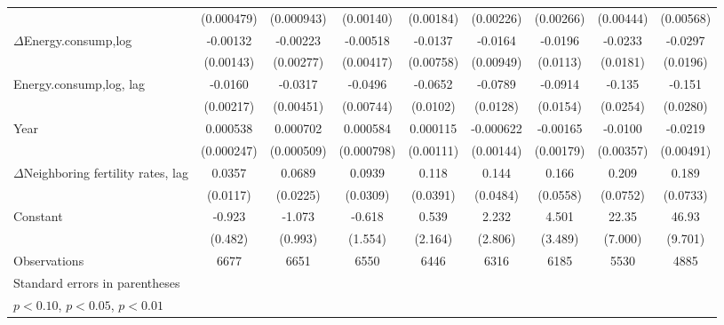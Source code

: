 \begin{table}[htbp]
\begin{tabular}{l*{8}{c}}
                    &  (0.000479)         &  (0.000943)         &   (0.00140)         &   (0.00184)         &   (0.00226)         &   (0.00266)         &   (0.00444)         &   (0.00568)         \\
[1em]
$\Delta$Energy.consump,log           &    -0.00132         &    -0.00223         &    -0.00518         &     -0.0137\sym{*}  &     -0.0164\sym{*}  &     -0.0196\sym{*}  &     -0.0233         &     -0.0297         \\
                    &   (0.00143)         &   (0.00277)         &   (0.00417)         &   (0.00758)         &   (0.00949)         &    (0.0113)         &    (0.0181)         &    (0.0196)         \\
[1em]
Energy.consump,log, lag             &     -0.0160\sym{***}&     -0.0317\sym{***}&     -0.0496\sym{***}&     -0.0652\sym{***}&     -0.0789\sym{***}&     -0.0914\sym{***}&      -0.135\sym{***}&      -0.151\sym{***}\\
                    &   (0.00217)         &   (0.00451)         &   (0.00744)         &    (0.0102)         &    (0.0128)         &    (0.0154)         &    (0.0254)         &    (0.0280)         \\
[1em]
Year                &    0.000538\sym{**} &    0.000702         &    0.000584         &    0.000115         &   -0.000622         &    -0.00165         &     -0.0100\sym{***}&     -0.0219\sym{***}\\
                    &  (0.000247)         &  (0.000509)         &  (0.000798)         &   (0.00111)         &   (0.00144)         &   (0.00179)         &   (0.00357)         &   (0.00491)         \\
[1em]
$\Delta$Neighboring fertility rates, lag&      0.0357\sym{***}&      0.0689\sym{***}&      0.0939\sym{***}&       0.118\sym{***}&       0.144\sym{***}&       0.166\sym{***}&       0.209\sym{***}&       0.189\sym{**} \\
                    &    (0.0117)         &    (0.0225)         &    (0.0309)         &    (0.0391)         &    (0.0484)         &    (0.0558)         &    (0.0752)         &    (0.0733)         \\
[1em]
Constant            &      -0.923\sym{*}  &      -1.073         &      -0.618         &       0.539         &       2.232         &       4.501         &       22.35\sym{***}&       46.93\sym{***}\\
                    &     (0.482)         &     (0.993)         &     (1.554)         &     (2.164)         &     (2.806)         &     (3.489)         &     (7.000)         &     (9.701)         \\
\hline
Observations        &        6677         &        6651         &        6550         &        6446         &        6316         &        6185         &        5530         &        4885         \\
\hline\hline
\multicolumn{9}{l}{\footnotesize Standard errors in parentheses}\\
\multicolumn{9}{l}{\footnotesize \sym{*} \(p<0.10\), \sym{**} \(p<0.05\), \sym{***} \(p<0.01\)}\\
\end{tabular}
\end{table}

